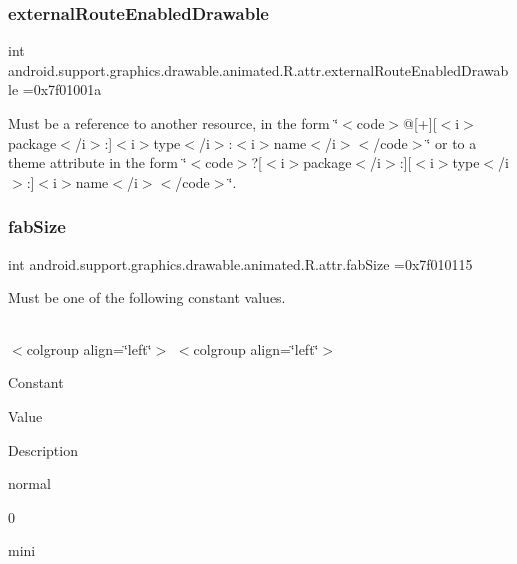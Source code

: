 \subsubsection{\texorpdfstring{external\+Route\+Enabled\+Drawable}{externalRouteEnabledDrawable}}
{\footnotesize\ttfamily int android.\+support.\+graphics.\+drawable.\+animated.\+R.\+attr.\+external\+Route\+Enabled\+Drawable =0x7f01001a\hspace{0.3cm}{\ttfamily [static]}}

Must be a reference to another resource, in the form \char`\"{}$<$code$>$@\mbox{[}+\mbox{]}\mbox{[}$<$i$>$package$<$/i$>$\+:\mbox{]}$<$i$>$type$<$/i$>$\+:$<$i$>$name$<$/i$>$$<$/code$>$\char`\"{} or to a theme attribute in the form \char`\"{}$<$code$>$?\mbox{[}$<$i$>$package$<$/i$>$\+:\mbox{]}\mbox{[}$<$i$>$type$<$/i$>$\+:\mbox{]}$<$i$>$name$<$/i$>$$<$/code$>$\char`\"{}. \mbox{\label{classandroid_1_1support_1_1graphics_1_1drawable_1_1animated_1_1R_1_1attr_a224b1a503db3b44afbe360b7e0615ac5}} 
\subsubsection{\texorpdfstring{fab\+Size}{fabSize}}
{\footnotesize\ttfamily int android.\+support.\+graphics.\+drawable.\+animated.\+R.\+attr.\+fab\+Size =0x7f010115\hspace{0.3cm}{\ttfamily [static]}}

Must be one of the following constant values.

\tabulinesep=1mm
\begin{longtabu} spread 0pt [c]{*{0}{|X[-1]}|}
\hline
\end{longtabu}
$<$colgroup align=\char`\"{}left\char`\"{}$>$ $<$colgroup align=\char`\"{}left\char`\"{}$>$ 

Constant

Value

Description 

{\ttfamily normal}

0

{\ttfamily mini}

